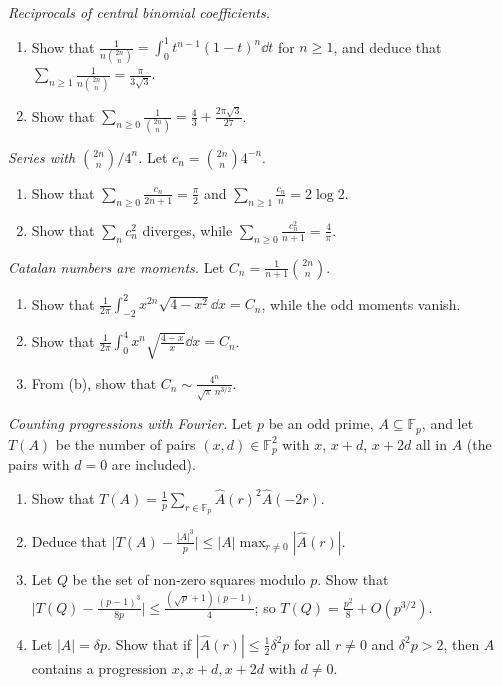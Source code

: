 \begin{exercise}[$\star\star$]\label{pb:centralsum}
\emph{Reciprocals of central binomial coefficients.}
\begin{enumerate}[label=(\alph*)]
\item Show that $\displaystyle\frac1{n\binom{2n}n}=\int_0^1t^{n-1}(1-t)^n\dd t$ for $n\ge1$, and deduce that $\displaystyle\sum_{n\ge1}\frac1{n\binom{2n}n}=\frac\pi{3\sqrt3}$.
\item Show that $\displaystyle\sum_{n\ge0}\frac1{\binom{2n}n}=\frac43+\frac{2\pi\sqrt3}{27}$.
\end{enumerate}
\end{exercise}

\begin{exercise}[$\star$]\label{pb:lehmer}
\emph{Series with $\binom{2n}n/4^n$.} Let $c_n=\binom{2n}n4^{-n}$.
\begin{enumerate}[label=(\alph*)]
\item Show that $\displaystyle\sum_{n\ge0}\frac{c_n}{2n+1}=\frac\pi2$ and $\displaystyle\sum_{n\ge1}\frac{c_n}n=2\log2$.
\item Show that $\sum_nc_n^2$ diverges, while $\displaystyle\sum_{n\ge0}\frac{c_n^2}{n+1}=\frac4\pi$.
\end{enumerate}
\end{exercise}

\begin{exercise}[$\star\star$]\label{pb:catalanmoments}
\emph{Catalan numbers are moments.} Let $C_n=\frac1{n+1}\binom{2n}n$.
\begin{enumerate}[label=(\alph*)]
\item Show that $\displaystyle\frac1{2\pi}\int_{-2}^2x^{2n}\sqrt{4-x^2}\dd x=C_n$, while the odd moments vanish.
\item Show that $\displaystyle\frac1{2\pi}\int_0^4x^n\sqrt{\frac{4-x}x}\dd x=C_n$.
\item From (b), show that $C_n\sim\frac{4^n}{\sqrt\pi\,n^{3/2}}$.
\end{enumerate}
\end{exercise}

\begin{exercise}[$\star\star$]\label{pb:apcount}
\emph{Counting progressions with Fourier.} Let $p$ be an odd prime, $A\subseteq\mathbb F_p$, and let $T(A)$ be the number of pairs
$(x,d)\in\mathbb F_p^2$ with $x$, $x+d$, $x+2d$ all in $A$ (the pairs with $d=0$ are included).
\begin{enumerate}[label=(\alph*)]
\item Show that $T(A)=\frac1p\sum_{r\in\mathbb F_p}\hat A(r)^2\hat A(-2r)$.
\item Deduce that $\bigl|T(A)-\frac{|A|^3}p\bigr|\le|A|\max_{r\ne0}|\hat A(r)|$.
\item Let $Q$ be the set of non-zero squares modulo $p$. Show that $\bigl|T(Q)-\frac{(p-1)^3}{8p}\bigr|\le\frac{(\sqrt p+1)(p-1)}4$; so $T(Q)=\frac{p^2}8+O(p^{3/2})$.
\item Let $|A|=\delta p$. Show that if $|\hat A(r)|\le\frac12\delta^2p$ for all $r\ne0$ and $\delta^2p>2$, then $A$ contains a
progression $x,x+d,x+2d$ with $d\ne0$.
\end{enumerate}
\end{exercise}

